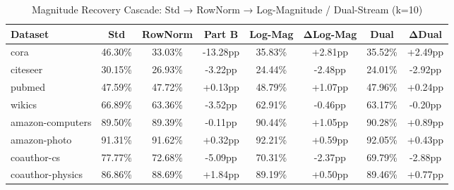 \begin{table}[t]
\centering
\caption{Magnitude Recovery Cascade: Std → RowNorm → Log-Magnitude / Dual-Stream (k=10)}
\label{tab:magnitude_cascade}
\begin{tabular}{lccccccc}
\toprule
\textbf{Dataset} & \textbf{Std} & \textbf{RowNorm} & \textbf{Part B} & \textbf{Log-Mag} & \textbf{ΔLog-Mag} & \textbf{Dual} & \textbf{ΔDual} \\
\midrule
cora                 &  46.30\% &  33.03\% &  -13.28pp &  35.83\% &  +2.81pp &  35.52\% &  +2.49pp \\
citeseer             &  30.15\% &  26.93\% &   -3.22pp &  24.44\% &  -2.48pp &  24.01\% &  -2.92pp \\
pubmed               &  47.59\% &  47.72\% &   +0.13pp &  48.79\% &  +1.07pp &  47.96\% &  +0.24pp \\
wikics               &  66.89\% &  63.36\% &   -3.52pp &  62.91\% &  -0.46pp &  63.17\% &  -0.20pp \\
amazon-computers     &  89.50\% &  89.39\% &   -0.11pp &  90.44\% &  +1.05pp &  90.28\% &  +0.89pp \\
amazon-photo         &  91.31\% &  91.62\% &   +0.32pp &  92.21\% &  +0.59pp &  92.05\% &  +0.43pp \\
coauthor-cs          &  77.77\% &  72.68\% &   -5.09pp &  70.31\% &  -2.37pp &  69.79\% &  -2.88pp \\
coauthor-physics     &  86.86\% &  88.69\% &   +1.84pp &  89.19\% &  +0.50pp &  89.46\% &  +0.77pp \\
\bottomrule
\end{tabular}
\end{table}
